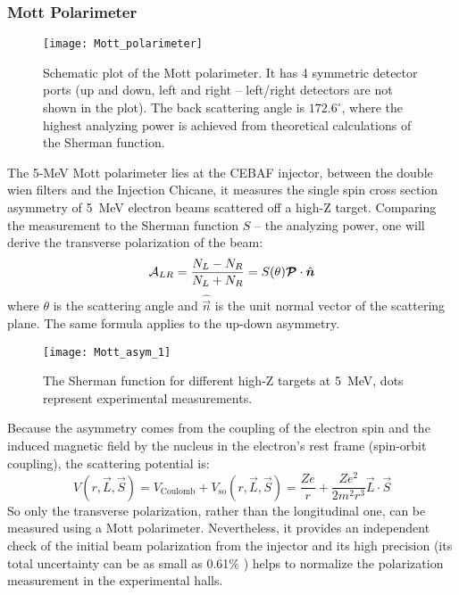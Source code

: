 \subsubsection{Mott Polarimeter}
\begin{figure}[!h]
    \centering
    \texttt{[image: Mott\_polarimeter]}
    \caption[Mott polarimeter]
    {Schematic plot of the Mott polarimeter. It has 4 symmetric detector
    ports (up and down, left and right -- left/right detectors are not shown in the plot). 
    The back scattering angle is $172.6^\circ$, where the highest analyzing power 
    is achieved from theoretical calculations of the Sherman function.
    \cite{PhysRevC.102.015501}}
\end{figure}
The 5-MeV Mott polarimeter lies at the CEBAF injector, between the double wien filters
and the Injection Chicane, it measures the single spin cross section asymmetry
of 5~MeV electron beams scattered off a high-Z target. Comparing the measurement
to the Sherman function $S$ \cite{PhysRev.103.1601} -- the analyzing power, one will 
derive the transverse polarization of the beam:
\begin{equation}
    \mathcal{A}_{LR} = \frac{N_L - N_R}{N_L + N_R} = S(\theta)\boldsymbol{\mathcal{P}}\cdot \hat{\boldsymbol{n}}
\end{equation}
where $\theta$ is the scattering angle and $\hat{\vec{n}}$ is the unit normal 
vector of the scattering plane. The same formula applies to the up-down asymmetry.
\begin{figure}
    \centering
    \texttt{[image: Mott\_asym\_1]}
    \caption[Sherman function]
    {The Sherman function for different high-Z targets at 5~MeV, dots
    represent experimental measurements.}   %
\end{figure}
Because the asymmetry comes from the coupling of the electron spin and the induced
magnetic field by the nucleus in the electron's rest frame (spin-orbit coupling), 
the scattering potential is:
\begin{equation}
    V(r, \vec{L}, \vec{S}) = V_{\text{Coulomb}} + V_{\text{so}} (r, \vec{L}, \vec{S}) 
    = \frac{Ze}{r} + \frac{Ze^2}{2m^2r^3}\vec{L}\cdot \vec{S}
\end{equation}
So only the transverse polarization, rather than the longitudinal one, can be 
measured using a Mott polarimeter. Nevertheless, it provides an
independent check of the initial beam polarization from the injector and its high
precision (its total uncertainty can be as small as 0.61\% \cite{PhysRevC.102.015501}) 
helps to normalize the polarization measurement in the experimental halls.

